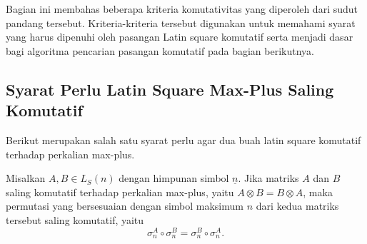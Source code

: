 Bagian ini membahas beberapa kriteria komutativitas yang diperoleh dari sudut pandang tersebut. Kriteria-kriteria tersebut digunakan untuk memahami syarat yang harus dipenuhi oleh pasangan Latin square komutatif serta menjadi dasar bagi algoritma pencarian pasangan komutatif pada bagian berikutnya.

\subsection{Syarat Perlu Latin Square Max-Plus Saling Komutatif}
Berikut merupakan salah satu syarat perlu agar dua buah latin square komutatif terhadap perkalian max-plus.

\begin{teorema}\label{thm:komutatif_elemen_maksimum}
  Misalkan $A, B \in L_S(n)$ dengan himpunan simbol $\underline{n}$. Jika matriks $A$ dan $B$ saling komutatif terhadap perkalian max-plus, yaitu $A \otimes B = B \otimes A$, maka permutasi yang bersesuaian dengan simbol maksimum $n$ dari kedua matriks tersebut saling komutatif, yaitu
  \[
    \sigma_n^A \circ \sigma_n^B
    =
    \sigma_n^B \circ \sigma_n^A.
  \]
\end{teorema}

